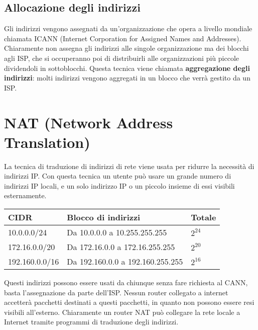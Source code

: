     \subsection{Allocazione degli indirizzi}
        Gli indirizzi vengono assegnati da un'organizzazione che opera a livello mondiale chiamata ICANN (Internet Corporation for Assigned Names and Addresses). Chiaramente non assegna gli indirizzi alle singole organizzazione ma dei blocchi agli ISP, che si occuperanno poi di distribuirli alle organizzazioni più piccole dividendoli in sottoblocchi. Questa tecnica viene chiamata \textbf{aggregazione degli indirizzi}: molti indirizzi vengono aggregati in un blocco che verrà gestito da un ISP.
        
\section{NAT (Network Address Translation)}
    La tecnica di traduzione di indirizzi di rete viene usata per ridurre la necessità di indirizzi IP. Con questa tecnica un utente può usare un grande numero di indirizzi IP locali, e un solo indirizzo IP o un piccolo insieme di essi visibili esternamente. 
    
    \begin{table}[h]
        \begin{center}
            \begin{tabular}{lll}
                \hline
                CIDR & Blocco di indirizzi & Totale     \\ \hline
                10.0.0.0/24      & Da 10.0.0.0 a 10.255.255.255              & $2^{24}$    \\
                172.16.0.0/20      & Da 172.16.0.0 a 172.16.255.255         & $2^{20}$    \\
                192.160.0.0/16      & Da 192.160.0.0 a 192.160.255.255     & $2^{16}$    \\
            \end{tabular}
        \end{center}
    \end{table}
    
    Questi indirizzi possono essere usati da chiunque senza fare richiesta al CANN, basta l'assegnazione da parte dell'ISP. Nessun router collegato a internet accetterà pacchetti destinati a questi pacchetti, in quanto non possono essere resi visibili all'esterno. Chiaramente un router NAT può collegare la rete locale a Internet tramite programmi di traduzione degli indirizzi.
    
